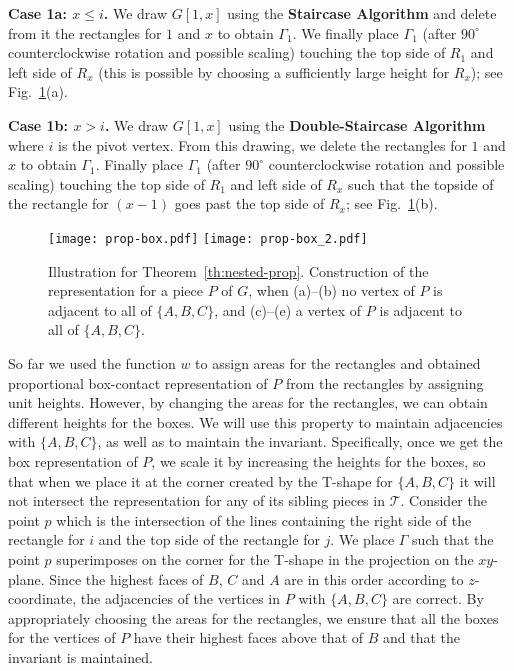 \documentclass{llncs}
\begin{document}
	\textbf{Case 1a: $x\le i$.} We draw $G[1,x]$ using the \textbf{Staircase Algorithm} and
	delete from it the rectangles for $1$ and $x$ to obtain $\Gamma_1$. We finally place
	$\Gamma_1$ (after $90^{\circ}$ counterclockwise rotation and possible scaling) touching
	the top side of $R_1$ and left side of $R_x$ (this is possible by choosing a sufficiently
	large height for $R_x$); see Fig.~\ref{fig:prop}(a).
	
	
	\textbf{Case 1b: $x>i$.} We draw $G[1,x]$ using the \textbf{Double-Staircase Algorithm}
	where $i$ is the pivot vertex. From this drawing, we delete the rectangles for $1$
and $x$ to obtain $\Gamma_1$. Finally place $\Gamma_1$ (after $90^{\circ}$ counterclockwise
	rotation and possible scaling) touching the top side of $R_1$ and left side of $R_x$ such
	that the topside of the rectangle for $(x-1)$ goes past the top side of $R_x$; see Fig.~\ref{fig:prop}(b).
	

\begin{figure}[htbp]
\vspace{-1cm}
	\centering
	\texttt{[image: prop-box.pdf]}
	\texttt{[image: prop-box\_2.pdf]}
	\caption{Illustration for Theorem~\ref{th:nested-prop}.
	Construction of the representation for a piece $P$ of $G$,
when (a)--(b) no vertex of $P$ is adjacent to all of $\{A,B,C\}$, and
	(c)--(e) a vertex of $P$ is adjacent to all of $\{A,B,C\}$.}
\label{fig:prop}
\end{figure}



	
So far we used the function $w$ to assign areas for the rectangles and obtained proportional box-contact representation of $P$ from the rectangles by assigning unit heights. However, by changing the areas for the
	rectangles, we can obtain different heights for the boxes. We will use this property to maintain adjacencies with $\{A,B,C\}$, as well as to maintain the invariant. Specifically, once we get the box
	representation of $P$, we scale it 
by increasing the heights for the boxes, so that when we place it at the corner created by
	the T-shape for $\{A,B,C\}$ it will not intersect the representation for
	any of its sibling pieces in $\mathcal{T}$. Consider the point $p$ which is the intersection
	of the lines containing the right side of the rectangle for $i$ and the top side of the
	rectangle for $j$. We place $\Gamma$ such that the point $p$ superimposes
	on the corner for the T-shape in the projection on the $xy$-plane. Since the highest faces
	of $B$, $C$ and $A$ are in this order according to $z$-coordinate,
	the adjacencies of the vertices in $P$ with $\{A,B,C\}$ are correct. By appropriately choosing the areas
	for the rectangles, we ensure that all the boxes for the vertices of $P$
	have their highest faces above that of $B$ and that the invariant is maintained.
	
\end{document}
